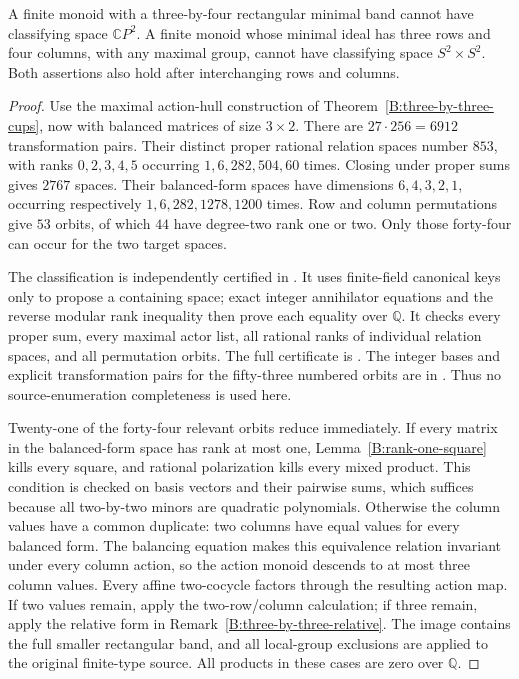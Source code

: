 \begin{theorem}
\label{B:three-by-four-targets}
A finite monoid with a three-by-four rectangular minimal band cannot
have classifying space $\mathbb CP^2$.
A finite monoid whose minimal ideal has three rows and four columns,
with any maximal group, cannot have classifying space $S^2\times S^2$.
Both assertions also hold after interchanging rows and columns.
\end{theorem}
\begin{proof}
Use the maximal action-hull construction of
Theorem~\ref{B:three-by-three-cups}, now with balanced matrices of
size $3\times2$.  There are $27\cdot256=6912$ transformation pairs.
Their distinct proper rational relation spaces number $853$, with
ranks $0,2,3,4,5$ occurring $1,6,282,504,60$ times.
Closing under proper sums gives $2767$ spaces.  Their balanced-form
spaces have dimensions $6,4,3,2,1$, occurring respectively
$1,6,282,1278,1200$ times.  Row and column permutations give $53$
orbits, of which $44$ have degree-two rank one or two.
Only those forty-four can occur for the two target spaces.

The classification is independently certified in
.
It uses finite-field canonical keys only to propose a containing
space; exact integer annihilator equations and the reverse modular
rank inequality then prove each equality over $\mathbb Q$.
It checks every proper sum, every maximal actor list, all rational
ranks of individual relation spaces, and all permutation orbits.
The full certificate is
.
The integer bases and explicit transformation pairs for the fifty-three
numbered orbits are in
.
Thus no source-enumeration completeness is used here.

Twenty-one of the forty-four relevant orbits reduce immediately.
If every matrix in the balanced-form space has rank at most one,
Lemma~\ref{B:rank-one-square} kills every square, and rational
polarization kills every mixed product.  This condition is checked
on basis vectors and their pairwise sums, which suffices because
all two-by-two minors are quadratic polynomials.
Otherwise the column values have a common duplicate: two columns
have equal values for every balanced form.  The balancing equation
makes this equivalence relation invariant under every column action,
so the action monoid descends to at most three column values.
Every affine two-cocycle factors through the resulting action map.
If two values remain, apply the two-row/column calculation; if three
remain, apply the relative form in
Remark~\ref{B:three-by-three-relative}.
The image contains the full smaller rectangular band, and all
local-group exclusions are applied to the original finite-type
source.  All products in these cases are zero over $\mathbb Q$.


\end{proof}
